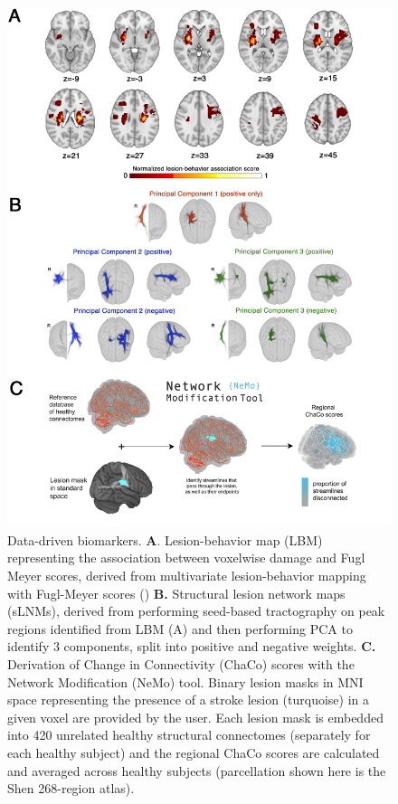 \documentclass[10pt]{article}
\begin{document}
\begin{figure}[htp]
\centering
\includegraphics[width=0.9\linewidth]{figures/data_driven.png}
\caption{Data-driven biomarkers. \textbf{A}. Lesion-behavior map (LBM) representing the association between voxelwise damage and Fugl Meyer scores, derived from multivariate lesion-behavior mapping with Fugl-Meyer scores (\cite{Bowren2022-rs}) \textbf{B.} Structural lesion network maps (sLNMs), derived from performing seed-based tractography on peak regions identified from LBM (A) and then performing PCA to identify 3 components, split into positive and negative weights. \textbf{C.} Derivation of Change in Connectivity (ChaCo) scores with the Network Modification (NeMo) tool. Binary lesion masks in MNI space representing the presence of a stroke lesion (turquoise) in a given voxel are provided by the user. Each lesion mask is embedded into 420 unrelated healthy structural connectomes (separately for each healthy subject) and the regional ChaCo scores are calculated and averaged across healthy subjects (parcellation shown here is the Shen 268-region atlas). }
\label{datadriven}
\end{figure}
\end{document}
